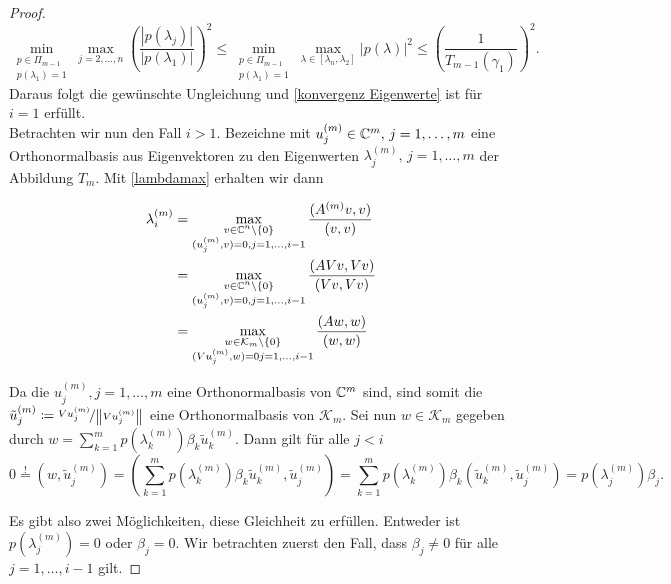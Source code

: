 \documentclass{article}
\begin{document}
\begin{theorem}
\begin{theorem}
\begin{proof}
		\begin{equation*}
			\min_{\substack{p\in \Pi_{m-1} \\ p(\lambda_1) = 1}} \max_{j=2,\dots,n} 	\left(\frac{|p(\lambda_j)|}{|p(\lambda_1)|}\right)^2 \le \min_{\substack{p\in \Pi_{m-1} \\ p(\lambda_1) = 1}} \max_{\lambda \in [\lambda_n,\lambda_2]} |p(\lambda)|^2 \le \left(\frac{1}{T_{m-1}(\gamma_1)}\right)^2.
		\end{equation*}
	Daraus folgt die gewünschte Ungleichung und \eqref{konvergenz Eigenwerte} ist für $i = 1$ erfüllt.\\

	Betrachten wir nun den Fall $i>1$.
	Bezeichne mit $u_j^{(m)} \in \mathbb{C}^m, \, j = 1,\dots, m$ eine Orthonormalbasis aus Eigenvektoren zu den Eigenwerten $\lambda_j^{(m)} , \, j = 1,\dots, m$ der Abbildung $T_m$. Mit \eqref{lambdamax} erhalten wir dann

	\begin{equation}
		\begin{aligned}
			\label{Darstellung EW}
			\lambda_i^{(m)} &= \max_{\substack{v\in \mathbb{C}^n\setminus \{0\} \\ (u_j^{(m)},v) = 0, j = 1,\dots,i-1}} \frac{(A^{(m)}v,v)}{(v,v)} \\
			&= \max_{\substack{v\in \mathbb{C}^n\setminus \{0\} \\ (u_j^{(m)},v) = 0, j = 1,\dots,i-1}} \frac{(AVv,Vv)}{(Vv,Vv)}\\
			&= \max_{\substack{w\in \mathcal{K}_m\setminus \{0\} \\ (Vu_j^{(m)},w) = 0 j = 1,\dots,i-1}} \frac{(Aw,w)}{(w,w)}
		\end{aligned}
	\end{equation}

	Da die $u_j^{(m)}, j = 1,\dots,m$ eine Orthonormalbasis von $\mathbb{C}^m$ sind, sind somit die $\tilde{u}_j^{(m)} \coloneqq \nicefrac{Vu_j^{(m)}}{{\left \| Vu_j^{(m)} \right \|}_{}}$ eine Orthonormalbasis von $\mathcal{K}_m$. Sei nun $w\in \mathcal{K}_m$ gegeben durch $w = \sum_{k=1}^{m} p(\lambda_k^{(m)}) \beta_k \tilde{u}_k^{(m)}$. Dann gilt für alle $j < i$
	\begin{equation*}
		0 \stackrel{!}{=} (w,\tilde{u}_j^{(m)}) = (\sum_{k=1}^{m} p(\lambda_k^{(m)}) \beta_k \tilde{u}_k^{(m)},\tilde{u}_j^{(m)}) = \sum_{k=1}^{m} p(\lambda_k^{(m)}) \beta_k (\tilde{u}_k^{(m)},\tilde{u}_j^{(m)}) = p(\lambda_j^{(m)}) \beta_j.
	\end{equation*}

	Es gibt also zwei Möglichkeiten, diese Gleichheit zu erfüllen. Entweder ist $p(\lambda_j^{(m)}) = 0$ oder $\beta_j = 0$. Wir betrachten zuerst den Fall, dass  $\beta_j \neq 0$ für alle $j = 1,\dots, i-1$ gilt.


\end{proof}
\end{theorem}
\end{theorem}
\end{document}
